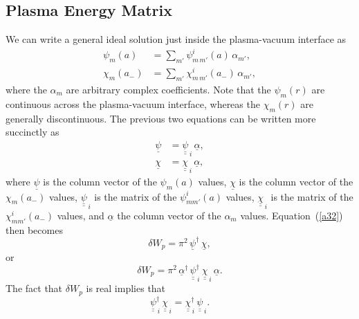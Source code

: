 \documentclass[12pt,prb,aps]{revtex4-1}
\begin{document}
\subsection{Plasma Energy Matrix}\label{penergy}
We can write a general ideal solution just inside the plasma-vacuum interface as
\begin{align}
\psi_m(a) &= \sum_{m'}\psi_{m\,m'}^i(a)\,\alpha_{m'},\\[0.5ex]
\chi_m(a_-) &= \sum_{m'}\chi_{m\,m'}^i(a_-)\,\alpha_{m'},
\end{align}
where the $\alpha_m$ are arbitrary complex coefficients.  Note that the $\psi_m(r)$ are continuous across the plasma-vacuum interface, whereas the $\chi_m(r)$ are generally discontinuous. 
The previous two equations can be written more succinctly as
\begin{align}\label{e41}
\underline{\psi}&= \underline{\underline{\psi}}_{\,i}\,\underline{\alpha},\\[0.5ex]
\underline{\chi}&= \underline{\underline{\chi}}_{\,i}\,\underline{\alpha},\label{e42}
\end{align}
where $\underline{\psi}$ is the column vector of the $\psi_m(a)$ values, $\underline{\chi}$ is the column vector of the $\chi_m(a_-)$ values,
$\underline{\underline{\psi}}_{\,i}$ is the matrix of the $\psi_{mm'}^i(a)$ values, $\underline{\underline{\chi}}_{\,i}$ is the matrix of the $\chi_{mm'}^i(a_-)$ values,
and $\underline{\alpha}$ the column vector of the $\alpha_m$ values. 
Equation~(\ref{a32}) then becomes
\begin{equation}
\delta W_p=\pi^2\,\underline{\psi}^\dag\,\underline{\chi},
\end{equation} 
or
\begin{equation}\label{e44}
\delta W_p =\pi^2\, \underline{\alpha}^\dag\,\underline{\underline{\psi}}^{\dag}_{\,i}\,\underline{\underline{\chi}}_{\,i}\,\underline{\alpha}.
\end{equation}
The fact that $\delta W_p$ is real implies that
 \begin{equation}\label{e47}
 \underline{\underline{\psi}}^{\dag}_{\,i}\,\underline{\underline{\chi}}_{\,i}= \underline{\underline{\chi}}^{\dag}_{\,i}\,\underline{\underline{\psi}}_{\,i}.
 \end{equation}
\end{document}
